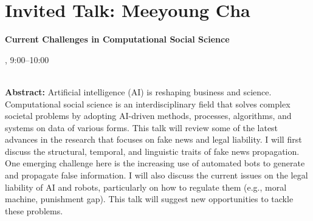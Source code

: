 \section{Invited Talk: Meeyoung Cha}


\begin{center}
\begin{Large}
{\bfseries\Large Current Challenges in Computational Social Science}\vspace{1em}\par
\end{Large}


\daydateyear, 9:00--10:00 \vspace{1em}\\
\PlenaryLoc \\
\vspace{1em}\par
\end{center}

\noindent
{\bfseries Abstract:} Artificial intelligence (AI) is reshaping business and science. Computational social science is an interdisciplinary field that solves complex societal problems by adopting AI-driven methods, processes, algorithms, and systems on data of various forms. This talk will review some of the latest advances in the research that focuses on fake news and legal liability. I will first discuss the structural, temporal, and linguistic traits of fake news propagation. One emerging challenge here is the increasing use of automated bots to generate and propagate false information. I will also discuss the current issues on the legal liability of AI and robots, particularly on how to regulate them (e.g., moral machine, punishment gap). This talk will suggest new opportunities to tackle these problems. 

\vspace{3em}\par 

\vfill
\noindent

